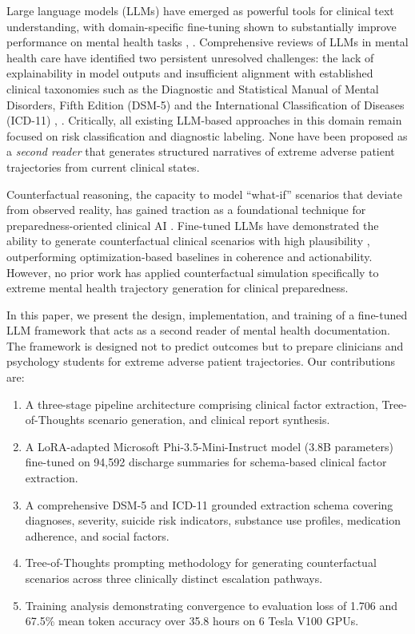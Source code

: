 \documentclass[conference]{IEEEtran}
\begin{document}
Large language models (LLMs) have emerged as powerful tools for clinical text understanding, with domain-specific fine-tuning shown to substantially improve performance on mental health tasks \cite{b4}, \cite{b5}. Comprehensive reviews of LLMs in mental health care have identified two persistent unresolved challenges: the lack of explainability in model outputs and insufficient alignment with established clinical taxonomies such as the Diagnostic and Statistical Manual of Mental Disorders, Fifth Edition (DSM-5) and the International Classification of Diseases (ICD-11) \cite{b6}, \cite{b7}. Critically, all existing LLM-based approaches in this domain remain focused on risk classification and diagnostic labeling. None have been proposed as a \textit{second reader} that generates structured narratives of extreme adverse patient trajectories from current clinical states.

Counterfactual reasoning, the capacity to model ``what-if'' scenarios that deviate from observed reality, has gained traction as a foundational technique for preparedness-oriented clinical AI \cite{b8}. Fine-tuned LLMs have demonstrated the ability to generate counterfactual clinical scenarios with high plausibility \cite{b9}, outperforming optimization-based baselines in coherence and actionability. However, no prior work has applied counterfactual simulation specifically to extreme mental health trajectory generation for clinical preparedness.

In this paper, we present the design, implementation, and training of a fine-tuned LLM framework that acts as a second reader of mental health documentation. The framework is designed not to predict outcomes but to prepare clinicians and psychology students for extreme adverse patient trajectories. Our contributions are:

\begin{enumerate}
\item A three-stage pipeline architecture comprising clinical factor extraction, Tree-of-Thoughts scenario generation, and clinical report synthesis.
\item A LoRA-adapted Microsoft Phi-3.5-Mini-Instruct model (3.8B parameters) fine-tuned on 94,592 discharge summaries for schema-based clinical factor extraction.
\item A comprehensive DSM-5 and ICD-11 grounded extraction schema covering diagnoses, severity, suicide risk indicators, substance use profiles, medication adherence, and social factors.
\item Tree-of-Thoughts prompting methodology for generating counterfactual scenarios across three clinically distinct escalation pathways.
\item Training analysis demonstrating convergence to evaluation loss of 1.706 and 67.5\% mean token accuracy over 35.8 hours on 6 Tesla V100 GPUs.
\end{enumerate}
\end{document}
